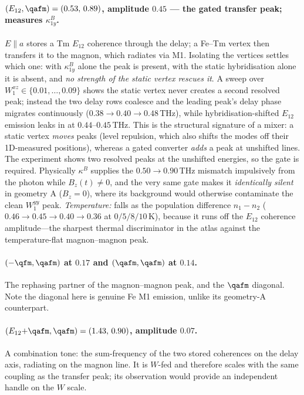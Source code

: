 \paragraph{$(E_{12},\qafm)=(0.53,\,0.89)$, amplitude $0.45$ --- the
gated transfer peak; measures $\kappa^B_{1y}$.}
$E\!\parallel\!a$ stores a Tm $E_{12}$ coherence through the delay; a
Fe--Tm vertex then transfers it to the magnon, which radiates via M1.
Isolating the vertices settles which one: with $\kappa^B_{1y}$ alone
the peak is present, with the static hybridisation alone it is absent,
and \emph{no strength of the static vertex rescues it}.  A sweep over
$W^{xz}_1\in\{0.01,\dots,0.09\}$ shows the static vertex never creates
a second resolved peak; instead the two delay rows coalesce and the
leading peak's delay phase migrates continuously
($0.38\to0.40\to0.48$\,THz), while hybridisation-shifted $E_{12}$
emission leaks in at $0.44$--$0.45$\,THz.  This is the structural
signature of a mixer: a static vertex \emph{moves} peaks (level
repulsion, which also shifts the modes off their 1D-measured
positions), whereas a gated converter \emph{adds} a peak at unshifted
lines.  The experiment shows two resolved peaks at the unshifted
energies, so the gate is required.  Physically $\kappa^B$ supplies the
$0.50\to0.90$\,THz mismatch impulsively from the photon while
$B_z(t)\neq0$, and the very same gate makes it \emph{identically
silent} in geometry A ($B_z=0$), where its background would otherwise
contaminate the clean $W^{yy}_1$ peak.  \emph{Temperature:} falls as
the population difference $n_1-n_2$
($0.46\to0.45\to0.40\to0.36$ at $0/5/8/10$\,K), because it runs off the
$E_{12}$ coherence amplitude---the sharpest thermal discriminator in
the atlas against the temperature-flat magnon--magnon peak.

\paragraph{$(-\qfm,\qafm)$ at $0.17$ and $(\qafm,\qafm)$ at $0.14$.}
The rephasing partner of the magnon--magnon peak, and the $\qafm$
diagonal.  Note the diagonal here is genuine Fe M1 emission, unlike its
geometry-A counterpart.

\paragraph{$(E_{12}{+}\qafm,\qafm)=(1.43,\,0.90)$, amplitude $0.07$.}
A combination tone: the sum-frequency of the two stored coherences on
the delay axis, radiating on the magnon line.  It is $W$-fed and
therefore scales with the same coupling as the transfer peak; its
observation would provide an independent handle on the $W$ scale.

